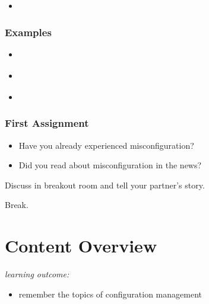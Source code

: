{\begin{frame}
\begin{itemize}[<+-| alert@+>]
		\item   \textcolor{white}{}
			\textcolor{white}{}
	\end{itemize}
\end{frame}
\begin{frame}
	\frametitle{Examples}
	\textcolor{white}{}
	\begin{itemize}[<+-| alert@+>]
		\item \textcolor{white}{}
		\item \textcolor{white}{}
		\item \textcolor{white}{}
	\end{itemize}
\end{frame}
}
\begin{assignment}
	\frametitle{First Assignment}
	\begin{itemize}
		\item Have you already experienced misconfiguration?
		\item Did you read about misconfiguration in the news?
	\end{itemize}
	\begin{task}
	Discuss in breakout room and tell your partner's story.
	\end{task}
\end{assignment}

\begin{assignment}
	\begin{task}
	Break.
	\end{task}
\end{assignment}

\section{Content Overview}

\begin{frame}
	\textit{learning outcome:}
	\begin{itemize}
		\item remember the topics of configuration management
	\end{itemize}
\end{frame}



